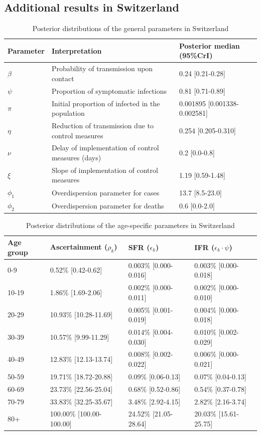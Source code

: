 \documentclass{article}
\begin{document}
\subsection{Additional results in Switzerland}
\begin{table}[H]
	\centering
	\begin{tabular}{lll}
		\hline
		Parameter & Interpretation & Posterior median (95\%CrI) \\ 
		\hline
		$\beta$ & Probability of transmission upon contact & 0.24 [0.21-0.28] \\ 
		$\psi$ & Proportion of symptomatic infections & 0.81 [0.71-0.89] \\ 
		$\pi$ & Initial proportion of infected in the population & 0.001895 [0.001338-0.002581] \\ 
		$\eta$ & Reduction of transmission due to control measures & 0.254 [0.205-0.310] \\ 
		$\nu$ & Delay of implementation of control measures (days) & 0.2 [0.0-0.8] \\ 
		$\xi$ & Slope of implementation of control measures & 1.19 [0.59-1.48] \\ 
		$\phi_1$ & Overdispersion parameter for cases & 13.7 [8.5-23.0] \\ 
		$\phi_2$ & Overdispersion parameter for deaths & 0.6 [0.0-2.0] \\ 
		\hline
	\end{tabular}
	\caption{Posterior distributions of the general parameters in Switzerland} 
\end{table}
\begin{table}[H]
	\centering
	\begin{tabular}{llll}
		\hline
		Age group & Ascertainment ($\rho_k$) & SFR ($\epsilon_k$) & IFR ($\epsilon_k\cdot\psi$) \\ 
		\hline
		0-9 & 0.52\% [0.42-0.62] & 0.003\% [0.000-0.016] & 0.003\% [0.000-0.018] \\ 
		10-19 & 1.86\% [1.69-2.06] & 0.002\% [0.000-0.011] & 0.002\% [0.000-0.010] \\ 
		20-29 & 10.93\% [10.28-11.69] & 0.005\% [0.001-0.019] & 0.004\% [0.000-0.018] \\ 
		30-39 & 10.57\% [9.99-11.29] & 0.014\% [0.004-0.030] & 0.010\% [0.002-0.029] \\ 
		40-49 & 12.83\% [12.13-13.74] & 0.008\% [0.002-0.022] & 0.006\% [0.000-0.021] \\ 
		50-59 & 19.71\% [18.72-20.88] & 0.09\% [0.06-0.13] & 0.07\% [0.04-0.13] \\ 
		60-69 & 23.73\% [22.56-25.04] & 0.68\% [0.52-0.86] & 0.54\% [0.37-0.78] \\ 
		70-79 & 33.83\% [32.25-35.67] & 3.48\% [2.92-4.15] & 2.82\% [2.16-3.74] \\ 
		80+ & 100.00\% [100.00-100.00] & 24.52\% [21.05-28.64] & 20.03\% [15.61-25.75] \\ 
		\hline
	\end{tabular}
	\caption{Posterior distributions of the age-specific parameters in Switzerland} 
\end{table}
\end{document}

